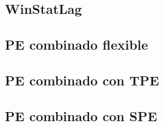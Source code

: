 \subsection{WinStatLag}
\subsection{PE combinado flexible}
\subsection{PE combinado con TPE}
\subsection{PE combinado con SPE}


